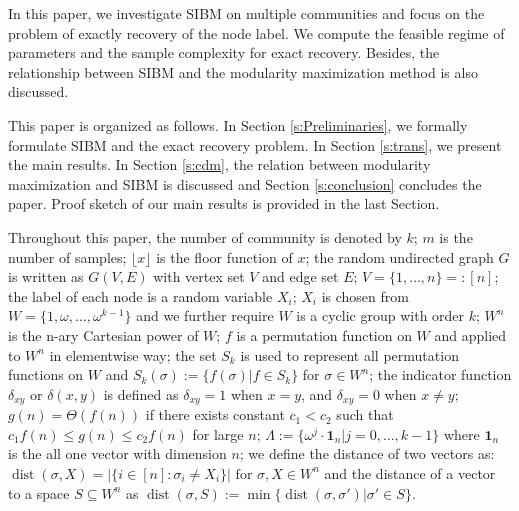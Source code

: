 \documentclass[conference]{IEEEtran}
\newcommand{\ide}[2]{ \delta_{#1 #2} }
\DeclareMathOperator{\dist}{dist}
\begin{document}
	In this paper, we  investigate SIBM on multiple communities and focus on the problem of exactly recovery of the node label.
	We  compute the feasible regime of parameters and the sample complexity for exact recovery. Besides, the relationship between SIBM and the modularity maximization method
	is also discussed. 
	
	This paper is organized as follows. In Section \ref{s:Preliminaries}, we formally formulate SIBM and the exact recovery problem.
	In Section \ref{s:trans}, we present the main results.
	In Section \ref{s:cdm}, the relation between modularity maximization and SIBM is discussed 
	and Section \ref{s:conclusion} concludes the paper.
	Proof sketch of our main results is provided in the last Section.
	
	Throughout this paper, the number of community is denoted by $k$; $m$ is the number of samples; $\lfloor x \rfloor$ is the floor function of $x$; the random undirected graph $G$ is written as $G(V,E)$ with vertex set $V$ and edge set $E$;
	$V=\{1,\dots, n\} =: [n]$;
	the label of each node is a random variable $X_i$; $X_i$ is chosen from $W= \{1, \omega, \dots, \omega^{k-1}\}$ and we further require $W$
	is a cyclic group with order $k$; $W^n$ is the n-ary Cartesian power of $W$; $f$ is a permutation function on $W$ and applied to $W^n$ in elementwise way; the set $S_k$ is used to represent all permutation functions on $W$ and $S_k(\sigma):=\{f(\sigma)| f\in S_k\}$ for $\sigma \in W^n$; the indicator function $\ide{x}{y}$ or $\delta(x,y)$ is defined as
	$\ide{x}{y} = 1 $ when $x=y$, and $\ide{x}{y}=0$ when $x\neq y$; $g(n) = \Theta(f(n))$ if there exists constant $c_1 < c_2$ such that $c_1 f(n) \leq g(n) \leq c_2 f(n)$
	for large $n$;
	$\Lambda := \{ \omega^j  \cdot \mathbf{1}_n | j=0, \dots,k-1\}$
	where $\mathbf{1}_n$ is the all one vector with dimension $n$;
	we define the distance of two vectors as:
	$\dist(\sigma, X)
	=|\{i\in[n]:\sigma_i\neq X_i\}| \textrm{ for } \sigma,X\in W^n
	$ and the distance of a vector to a space $S\subseteq W^n$
	as
	$\dist(\sigma,S)
	:=\min\{\dist(\sigma, \sigma') | \sigma' \in S\}
	$.
	
\end{document}
